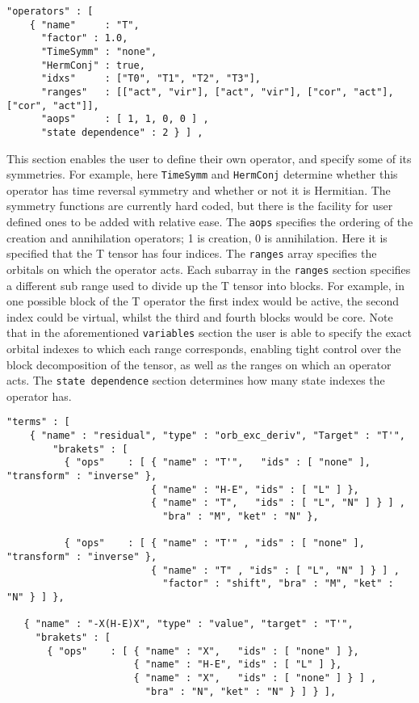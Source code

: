 \begin{lstlisting}[label={lst:operators}]
  "operators" : [
    { "name"     : "T",
      "factor" : 1.0,
      "TimeSymm" : "none",
      "HermConj" : true,
      "idxs"     : ["T0", "T1", "T2", "T3"],
      "ranges"   : [["act", "vir"], ["act", "vir"], ["cor", "act"], ["cor", "act"]],
      "aops"     : [ 1, 1, 0, 0 ] ,
      "state dependence" : 2 } ] ,
\end{lstlisting}         
\noindent This section enables the user to define their own operator, and
specify some of its symmetries. For example, here \texttt{TimeSymm} and
\texttt{HermConj} determine whether this operator has time reversal symmetry 
and whether or not it is Hermitian. The symmetry functions are 
currently hard coded, but there is the facility for user defined ones
to be added with relative ease.
 The \texttt{aops} specifies the ordering of the   
creation and annihilation operators; 1 is creation, 0 is annihilation.  Here it
is specified that the T tensor has four indices. The \texttt{ranges} array specifies the
orbitals on which the operator acts.  Each subarray in the \texttt{ranges} section
specifies a different sub range used to divide up the T tensor into blocks.
For example, in one possible block of the T operator the first index would be
active, the second index could be virtual, whilst the third and fourth blocks
would be core.  Note that in the aforementioned \texttt{variables} section the user is
able to specify the exact orbital indexes to which each range corresponds,
enabling tight control over the block decomposition of
the tensor, as well as the ranges on which an operator acts. 
The \texttt{state dependence} section determines how many state indexes 
the operator has.
\begin{lstlisting}[label={lst:terms}]
  "terms" : [
    { "name" : "residual", "type" : "orb_exc_deriv", "Target" : "T'",
        "brakets" : [
          { "ops"    : [ { "name" : "T'",   "ids" : [ "none" ], "transform" : "inverse" },
                         { "name" : "H-E", "ids" : [ "L" ] },
                         { "name" : "T",   "ids" : [ "L", "N" ] } ] ,
                           "bra" : "M", "ket" : "N" }, 

          { "ops"    : [ { "name" : "T'" , "ids" : [ "none" ], "transform" : "inverse" },
                         { "name" : "T" , "ids" : [ "L", "N" ] } ] ,
                           "factor" : "shift", "bra" : "M", "ket" : "N" } ] },

   { "name" : "-X(H-E)X", "type" : "value", "target" : "T'",
     "brakets" : [
       { "ops"    : [ { "name" : "X",   "ids" : [ "none" ] },
                      { "name" : "H-E", "ids" : [ "L" ] },
                      { "name" : "X",   "ids" : [ "none" ] } ] ,
                        "bra" : "N", "ket" : "N" } ] } ],
\end{lstlisting}         
